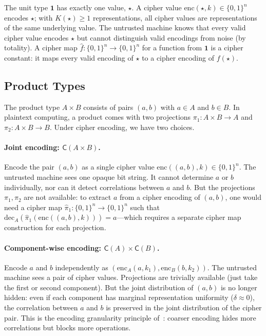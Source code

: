 \documentclass[11pt]{article}
\theoremstyle{definition}
\theoremstyle{plain}
\theoremstyle{remark}
\newcommand{\enc}{\mathrm{enc}}
\newcommand{\dec}{\mathrm{dec}}
\newcommand{\fhat}{\hat{f}}
\newcommand{\cipher}[1]{\mathsf{C}(#1)}
\newcommand{\B}{\{0,1\}}
\begin{document}
The unit type $\mathbf{1}$ has exactly one value, $\star$.
A cipher value $\enc(\star, k) \in \B^n$ encodes $\star$; with $K(\star) \geq 1$
representations, all cipher values are representations of the same
underlying value.
The untrusted machine knows that every valid cipher value encodes $\star$
but cannot distinguish valid encodings from noise (by totality).
A cipher map $\fhat : \B^n \to \B^n$ for a function from $\mathbf{1}$ is
a cipher constant: it maps every valid encoding of $\star$ to a cipher
encoding of $f(\star)$.


\subsection{Product Types}
\label{sec:products}

The product type $A \times B$ consists of pairs $(a, b)$ with $a \in A$ and
$b \in B$.
In plaintext computing, a product comes with two projections
$\pi_1 : A \times B \to A$ and $\pi_2 : A \times B \to B$.
Under cipher encoding, we have two choices.

\paragraph{Joint encoding: $\cipher{A \times B}$.}
Encode the pair $(a, b)$ as a single cipher value $\enc((a,b), k) \in \B^n$.
The untrusted machine sees one opaque bit string.
It cannot determine $a$ or $b$ individually, nor can it detect correlations
between $a$ and $b$.
But the projections $\pi_1, \pi_2$ are not available: to extract $a$ from a
cipher encoding of $(a,b)$, one would need a cipher map
$\hat{\pi}_1 : \B^n \to \B^n$ such that
$\dec_A(\hat{\pi}_1(\enc((a,b),k))) = a$---which requires a separate cipher
map construction for each projection.

\paragraph{Component-wise encoding:
$\cipher{A} \times \cipher{B}$.}
Encode $a$ and $b$ independently as
$(\enc_A(a, k_1),\allowbreak \enc_B(b, k_2))$.
The untrusted machine sees a pair of cipher values.
Projections are trivially available (just take the first or second
component).
But the joint distribution of $(a, b)$ is no longer hidden: even if each
component has marginal representation uniformity ($\delta \approx 0$),
the correlation between $a$ and $b$ is preserved in the joint distribution
of the cipher pair.
This is the encoding granularity principle
of~\cite[Sec.~8.1]{towell2026cipher}: coarser encoding hides more
correlations but blocks more operations.
\end{document}
